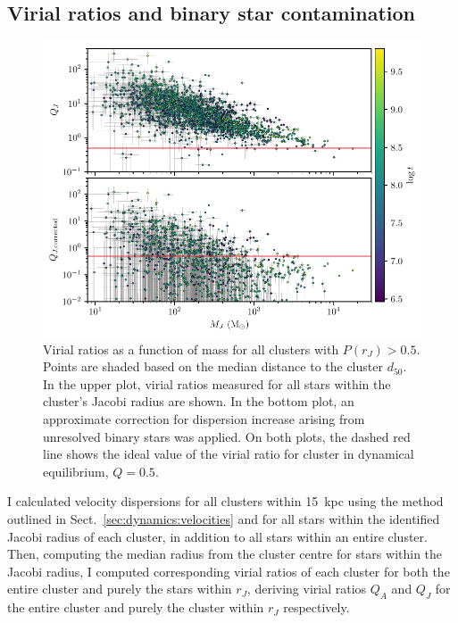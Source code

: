 \subsection{Virial ratios and binary star contamination}
\label{sec:dynamics:results:virial}

\begin{figure}[t]
    \centering
    \includegraphics[width=\textwidth]{fig/c4/results_virial_vs_mass.pdf}
    \caption[Virial ratios as a function of mass for all clusters with $P(r_J) > 0.5$]{Virial ratios as a function of mass for all clusters with $P(r_J) > 0.5$. Points are shaded based on the median distance to the cluster $d_{50}$. In the upper plot, virial ratios measured for all stars within the cluster's Jacobi radius are shown. In the bottom plot, an approximate correction for dispersion increase arising from unresolved binary stars was applied. On both plots, the dashed red line shows the ideal value of the virial ratio for cluster in dynamical equilibrium, $Q=0.5$.}
    \label{fig:dynamics:results:virial_vs_mass}
\end{figure}

I calculated velocity dispersions for all clusters within 15~kpc using the method outlined in Sect.~\ref{sec:dynamics:velocities} and for all stars within the identified Jacobi radius of each cluster, in addition to all stars within an entire cluster. Then, computing the median radius from the cluster centre for stars within the Jacobi radius, I computed corresponding virial ratios of each cluster for both the entire cluster and purely the stars within $r_J$, deriving virial ratios $Q_A$ and $Q_J$ for the entire cluster and purely the cluster within $r_J$ respectively.

